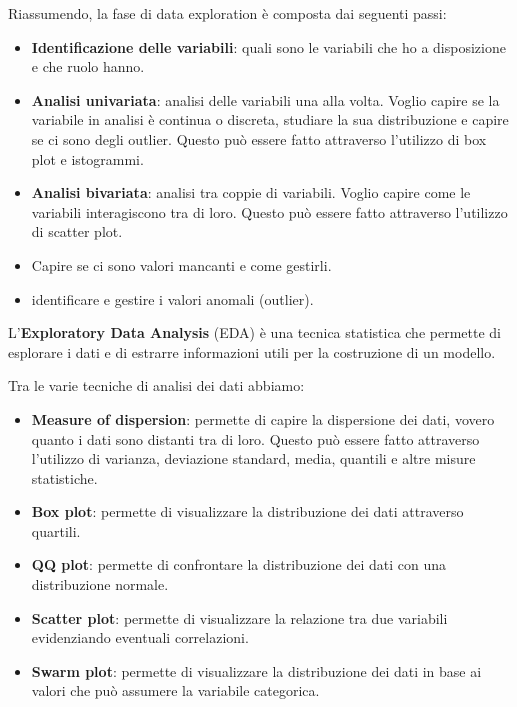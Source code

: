 Riassumendo, la fase di data exploration è composta dai seguenti passi:
\begin{itemize}
      \item \textbf{Identificazione delle variabili}: quali sono le variabili che ho
            a disposizione e che ruolo hanno.
      \item \textbf{Analisi univariata}: analisi delle variabili una alla volta.
            Voglio capire se la variabile in analisi è continua o discreta,
            studiare la sua distribuzione e capire se ci sono degli outlier. Questo
            può essere fatto attraverso l'utilizzo di box plot e istogrammi.
      \item \textbf{Analisi bivariata}: analisi tra coppie di variabili. Voglio
            capire come le variabili interagiscono tra di loro. Questo può essere
            fatto attraverso l'utilizzo di scatter plot.
      \item Capire se ci sono valori mancanti e come gestirli.
      \item identificare e gestire i valori anomali (outlier).
\end{itemize}

\begin{definizione}
      L'\textbf{Exploratory Data Analysis} (EDA) è una tecnica statistica che permette
      di esplorare i dati e di estrarre informazioni utili per la costruzione di un
      modello.
\end{definizione}

Tra le varie tecniche di analisi dei dati abbiamo:
\begin{itemize}
      \item \textbf{Measure of dispersion}: permette di capire la dispersione 
            dei dati, vovero quanto i dati sono
            distanti tra di loro. Questo può essere fatto attraverso l'utilizzo
            di varianza, deviazione standard, media, quantili e altre misure statistiche.
      \item \textbf{Box plot}: permette di visualizzare la distribuzione dei dati
            attraverso quartili.
      \item \textbf{QQ plot}: permette di confrontare la distribuzione dei dati
            con una distribuzione normale.
      \item \textbf{Scatter plot}: permette di visualizzare la relazione tra due
            variabili evidenziando eventuali correlazioni.
      \item \textbf{Swarm plot}: permette di visualizzare la distribuzione dei dati
            in base ai valori che può assumere la variabile categorica.
\end{itemize}

